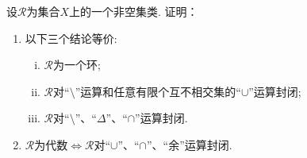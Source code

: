 \documentclass[../../main.tex]{subfiles}%
\begin{document}
\begin{proposition}
设$\mathscr{R}$为集合$X$上的一个非空集类. 证明：
\begin{enumerate}[(1)]
\item 以下三个结论等价:
\begin{enumerate}[(i)]
\item $\mathscr{R}$为一个环;

\item $\mathscr{R}$对“$\setminus$”运算和任意有限个互不相交集的“$\cup$”运算封闭;

\item $\mathscr{R}$对“$\setminus$”、“$\Delta$”、“$\cap$”运算封闭.
\end{enumerate}

\item $\mathscr{R}$为代数$\Leftrightarrow\mathscr{R}$对“$\cup$”、“$\cap$”、“余”运算封闭.
\end{enumerate}
\end{proposition}
\end{document}
